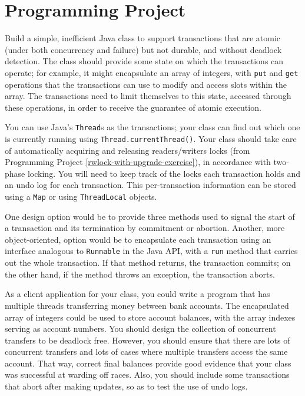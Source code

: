\section*{Programming Project}
\begin{chapterEnumerate}
\item
Build a simple, inefficient Java class to support transactions that
are atomic (under both concurrency and failure) but not durable, and
without deadlock detection.  The class should provide some state on which
the transactions can operate; for example, it might encapsulate an
array of integers, with \verb|put| and \verb|get| operations that the
transactions can use to modify and access slots within the array.  The
transactions need to limit themselves to this state, accessed through
these operations, in order to receive the guarantee of atomic
execution.

You can use Java's \verb|Thread|s as the transactions;
your class can find out which one is currently running using
\verb|Thread.currentThread()|.  Your class should take care of
automatically acquiring and releasing readers/writers locks (from
Programming Project \ref{rwlock-with-upgrade-exercise}),
in accordance with two-phase locking.  You will need to keep track
of the locks each transaction holds and an undo log for each transaction.
This per-transaction information can be stored using a \verb|Map| or using \verb|ThreadLocal| objects.

One design
option would be to provide three methods used to signal the start of a
transaction and its termination by commitment or abortion.  Another,
more object-oriented, option would be to encapsulate each transaction
using an interface analogous to \verb|Runnable| in the Java API, with
a \verb|run| method that carries out the whole transaction.  If that
method returns, the transaction commits; on the other hand, if the method throws
an exception, the transaction aborts.

As a client application for your class, you could write a program that
has multiple threads transferring money between bank accounts.  The
encapsulated array of integers could be used to store account
balances, with the array indexes serving as account numbers.
You should design the collection of concurrent transfers to be deadlock
free.  However, you should ensure that there are lots of
concurrent transfers and lots of cases where multiple transfers access
the same account.  That way, correct final balances provide good evidence
that your class was successful at warding off races.  Also, you
should include some transactions that abort after making updates,
so as to test the use of undo logs.

\end{chapterEnumerate}

